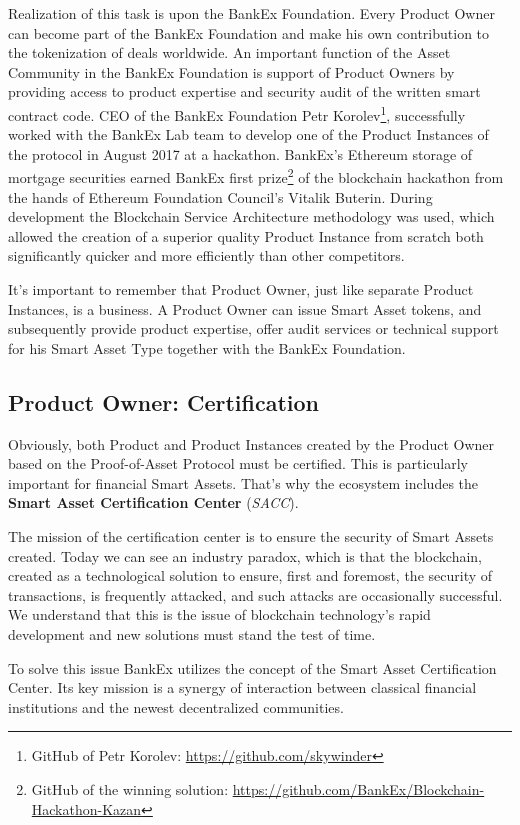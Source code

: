 \documentclass{article}
\begin{document}
\begin{multicols}{2}
Realization of this task is upon the BankEx Foundation. Every Product Owner can become part of the BankEx Foundation and make his own contribution to the tokenization of deals worldwide. An important function of the Asset Community in the BankEx Foundation is support of Product Owners by providing access to product expertise and security audit of the written smart contract code.
CEO of the BankEx Foundation Petr Korolev\footnote{GitHub of Petr Korolev: \url{https://github.com/skywinder}}, successfully worked with the BankEx Lab team to develop one of the Product Instances of the protocol in August 2017 at a hackathon. BankEx’s Ethereum storage of mortgage securities earned BankEx first prize\footnote{GitHub of the winning solution: \url{https://github.com/BankEx/Blockchain-Hackathon-Kazan}} of the blockchain hackathon from the hands of Ethereum Foundation Council’s Vitalik Buterin. During development the Blockchain Service Architecture methodology was used, which allowed the creation of a superior quality Product Instance from scratch both significantly quicker and more efficiently than other competitors.

It's important to remember that Product Owner, just like separate Product Instances, is a business. A Product Owner can issue Smart Asset tokens, and subsequently provide product expertise, offer audit services or technical support for his Smart Asset Type together with the BankEx Foundation.

\subsection{Product Owner: Certification}

Obviously, both Product and Product Instances created by the Product Owner based on the Proof-of-Asset Protocol must be certified. This is particularly important for financial Smart Assets. That’s why the ecosystem includes the \textbf{Smart Asset Certification Center} (\textit{SACC}).

The mission of the certification center is to ensure the security of Smart Assets created. Today we can see an industry paradox, which is that the blockchain, created as a technological solution to ensure, first and foremost, the security of transactions, is frequently attacked, and such attacks are occasionally successful. We understand that this is the issue of blockchain technology's rapid development and new solutions must stand the test of time.

To solve this issue BankEx utilizes the concept of the Smart Asset Certification Center. Its key mission is a synergy of interaction between classical financial institutions and the newest decentralized communities.


\end{multicols}
\end{document}
